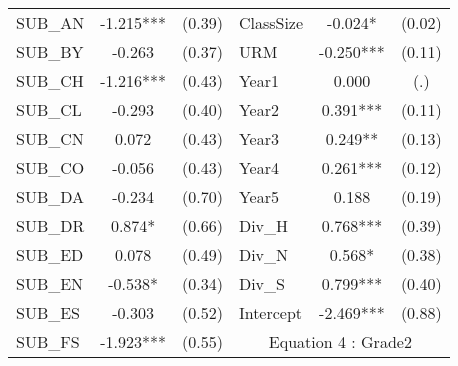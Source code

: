 \begin{table}[htb]
\begin{threeparttable}
\begin{tabular}{l c c|l c c}
    SUB\_AN                                      & -1.215***                  & (0.39)               & ClassSize           & -0.024*                & (0.02)               \\
    SUB\_BY                                      & -0.263                     & (0.37)               & URM                 & -0.250***              & (0.11)               \\
    SUB\_CH                                      & -1.216***                  & (0.43)               & Year1               & 0.000                  & (.)                  \\
    SUB\_CL                                      & -0.293                     & (0.40)               & Year2               & 0.391***               & (0.11)               \\
    SUB\_CN                                      & 0.072                      & (0.43)               & Year3               & 0.249**                & (0.13)               \\
    SUB\_CO                                      & -0.056                     & (0.43)               & Year4               & 0.261***               & (0.12)               \\
    SUB\_DA                                      & -0.234                     & (0.70)               & Year5               & 0.188                  & (0.19)               \\
    SUB\_DR                                      & 0.874*                     & (0.66)               & Div\_H              & 0.768***               & (0.39)               \\
    SUB\_ED                                      & 0.078                      & (0.49)               & Div\_N              & 0.568*                 & (0.38)               \\
    SUB\_EN                                      & -0.538*                    & (0.34)               & Div\_S              & 0.799***               & (0.40)               \\
    SUB\_ES                                      & -0.303                     & (0.52)               & Intercept           & -2.469***              & (0.88)               \\
    \cline{4-6}
    SUB\_FS                                      & -1.923***                  & (0.55)               & \multicolumn{3}{c}{Equation 4 : Grade2}                             \\
    \cline{4-6}

\end{tabular}
\end{threeparttable}
\end{table}
